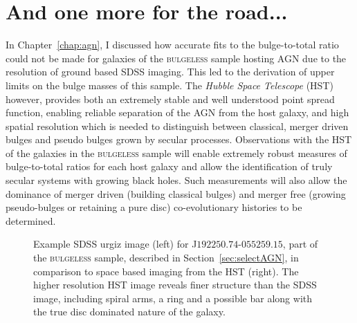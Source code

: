 \section{And one more for the road...}\label{sec:hst}

In Chapter~\ref{chap:agn}, I discussed how accurate fits to the bulge-to-total ratio could not be made for galaxies of the \textsc{bulgeless} sample hosting AGN due to the resolution of ground based SDSS imaging. This led to the derivation of upper limits on the bulge masses of this sample. The \emph{Hubble Space Telescope} (HST) however, provides both an extremely stable and well understood point spread function, enabling reliable separation of the AGN from the host galaxy, and high spatial resolution which is needed to distinguish between classical, merger driven bulges and pseudo bulges grown by secular processes. Observations with the HST of the galaxies in the \textsc{bulgeless} sample will enable extremely robust measures of bulge-to-total ratios for each host galaxy and allow the identification of truly secular systems with growing black holes. Such measurements will also allow the dominance of merger driven (building classical bulges) and merger free (growing pseudo-bulges or retaining a pure disc) co-evolutionary histories to be determined. 

\begin{figure}
\caption[Example HST image data in comparison to SDSS]{Example SDSS urgiz image (left) for J$192250.74$-$055259.15$, part of the \textsc{bulgeless} sample, described in Section~\ref{sec:selectAGN}, in comparison to space based imaging from the HST (right). The higher resolution HST image reveals finer structure than the SDSS image, including spiral arms, a ring and a possible bar along with the true disc dominated nature of the galaxy.}
\label{fig:hstdata}
\end{figure}


